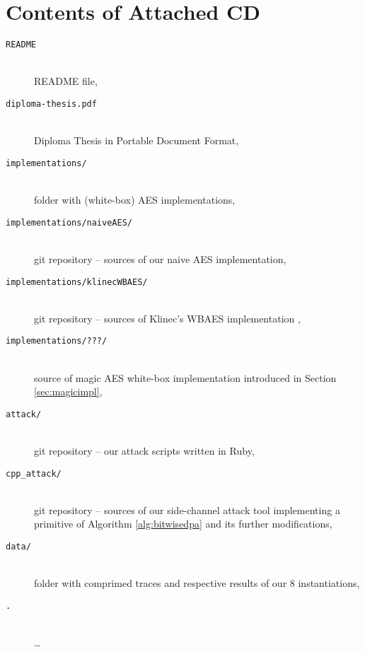 \chapter{Contents of Attached CD}
\label{app:cd}
	
	\begin{description}
		\item[\tt README] ~ \\ README file,
		\item[\tt diploma-thesis.pdf] ~ \\ Diploma Thesis in Portable Document Format,
		\item[\tt implementations/] ~ \\ folder with (white-box) AES implementations,
		\item[\tt implementations/naiveAES/] ~ \\ git repository -- sources of our naive AES implementation,
		\item[\tt implementations/klinecWBAES/] ~ \\ git repository -- sources of Klinec's WBAES implementation \cite{klinec2013implementation},
		\item[\tt implementations/???/] ~ \\ source of magic AES white-box implementation introduced in Section \ref{sec:magicimpl},
		\item[\tt attack/] ~ \\ git repository -- our attack scripts written in Ruby,
		\item[\tt cpp\_attack/] ~ \\ git repository -- sources of our side-channel attack tool implementing a primitive of Algorithm \ref{alg:bitwisedpa} and its further modifications,
		\item[\tt data/] ~ \\ folder with comprimed traces and respective results of our $8$ instantiations,
		\item[\tt .] ~ \\ \ldots
	\end{description}
